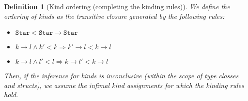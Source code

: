 \documentclass[12pt,a4paper]{article}
\newtheorem{definition}{Definition}
\begin{document}
\begin{definition}[Kind ordering (completing the kinding rules)]
    We define the ordering of kinds as the transitive closure generated by the following rules:
    \begin{itemize}
        \item $\mathtt{Star} < \mathtt{Star} \to \mathtt{Star}$
        \item $k \to l \wedge k' < k \Rightarrow k' \to l < k \to l$
        \item $k \to l \wedge l' < l \Rightarrow k \to l' < k \to l$
    \end{itemize}

    Then, if the inference for kinds is inconclusive (within the scope of type classes and structs), we assume the infimal kind assignments for which the kinding rules hold.
\end{definition}
\end{document}
